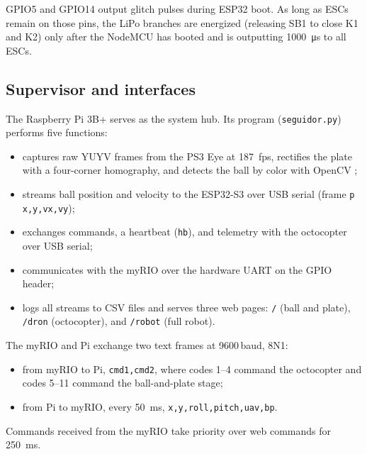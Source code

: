 GPIO5 and GPIO14 output glitch pulses during ESP32 boot. As long as ESCs remain on those pins, the LiPo branches are energized (releasing SB1 to close K1 and K2) only after the NodeMCU has booted and is outputting \SI{1000}{\micro\second} to all ESCs.

\subsection{Supervisor and interfaces}
\label{sec:interfaces}
The Raspberry Pi 3B+ serves as the system hub. Its program (\texttt{seguidor.py}) performs five functions:
\begin{itemize}
  \item captures raw YUYV frames from the PS3 Eye at \SI{187}{fps}, rectifies the plate with a four-corner homography, and detects the ball by color with OpenCV \cite{bradski2000};
  \item streams ball position and velocity to the ESP32-S3 over USB serial (frame \texttt{p x,y,vx,vy});
  \item exchanges commands, a heartbeat (\texttt{hb}), and telemetry with the octocopter over USB serial;
  \item communicates with the myRIO over the hardware UART on the GPIO header;
  \item logs all streams to CSV files and serves three web pages: \texttt{/} (ball and plate), \texttt{/dron} (octocopter), and \texttt{/robot} (full robot).
\end{itemize}
The myRIO and Pi exchange two text frames at 9600\,baud, 8N1:
\begin{itemize}
  \item from myRIO to Pi, \texttt{cmd1,cmd2}, where codes 1--4 command the octocopter and codes 5--11 command the ball-and-plate stage;
  \item from Pi to myRIO, every \SI{50}{\milli\second}, \texttt{x,y,roll,pitch,uav,bp}.
\end{itemize}
Commands received from the myRIO take priority over web commands for \SI{250}{\milli\second}.

